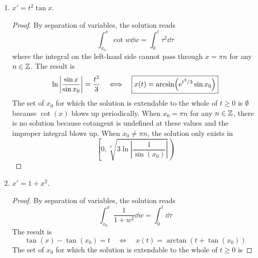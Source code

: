 \documentclass[../psets.tex]{subfiles}
\begin{document}
\begin{enumerate}
\begin{enumerate}
\begin{proof}
\begin{equation*}
                \ln\frac{x}{x_0} = 1-\cos t
                \quad\Longleftrightarrow\quad
                \boxed{x(t) = x_0\e[1-\cos t]}
            \end{equation*}
            The set of $x_0$ for which this solution is extendable to the whole of $t\geq 0$ is $\boxed{\R}$.
        \end{proof}
        \item $x'=t^2\tan x$.
        \begin{proof}
            By separation of variables, the solution reads
            \begin{equation*}
                \int_{x_0}^x\cot w\dd{w} = \int_0^t\tau^2\dd\tau
            \end{equation*}
            where the integral on the left-hand side cannot pass through $x=\pi n$ for any $n\in\Z$. The result is
            \begin{equation*}
                \ln\left| \frac{\sin x}{\sin x_0} \right| = \frac{t^3}{3}
                \quad\Longleftrightarrow\quad
                \boxed{x(t) = \arcsin(\e[t^3/3]\sin x_0)}
            \end{equation*}
            The set of $x_0$ for which the solution is extendable to the whole of $t\geq 0$ is $\boxed{\emptyset}$ because $\cot(x)$ blows up periodically. When $x_0=\pi n$ for any $n\in\Z$, there is no solution because cotangent is undefined at these values and the improper integral blows up. When $x_0\neq\pi n$, the solution only exists in
            \begin{equation*}
                \boxed{\left[ 0,\sqrt[3]{3\ln\left| \frac{1}{\sin(x_0)} \right|} \right)}
            \end{equation*}
        \end{proof}
        \item $x'=1+x^2$.
        \begin{proof}
            By separation of variables, the solution reads
            \begin{equation*}
                \int_{x_0}^x\frac{1}{1+w^2}\dd{w} = \int_0^t\dd\tau
            \end{equation*}
            The result is
            \begin{equation*}
                \tan(x)-\tan(x_0) = t
                \quad\Longleftrightarrow\quad
                \boxed{x(t) = \arctan(t+\tan(x_0))}
            \end{equation*}
            The set of $x_0$ for which the solution is extendable to the whole of $t\geq 0$ is

\end{proof}
\end{enumerate}
\end{enumerate}
\end{document}
